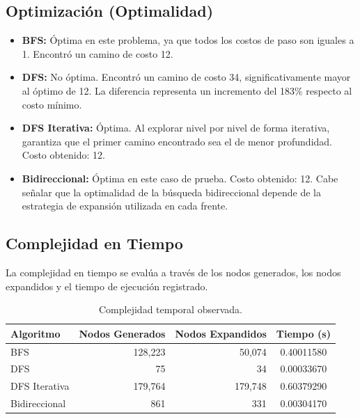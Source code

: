 \documentclass{article}
\begin{document}
\subsection{Optimización (Optimalidad)}

\begin{itemize}

    \item \textbf{BFS:} Óptima en este problema, ya que todos los
    costos de paso son iguales a 1. Encontró un camino de costo 12.

    \item \textbf{DFS:} No óptima. Encontró un camino de costo 34,
    significativamente mayor al óptimo de 12. La diferencia representa
    un incremento del 183\% respecto al costo mínimo.

    \item \textbf{DFS Iterativa:} Óptima. Al explorar nivel por nivel
    de forma iterativa, garantiza que el primer camino encontrado sea
    el de menor profundidad. Costo obtenido: 12.

    \item \textbf{Bidireccional:} Óptima en este caso de prueba.
    Costo obtenido: 12. Cabe señalar que la optimalidad de la búsqueda
    bidireccional depende de la estrategia de expansión utilizada en
    cada frente.

\end{itemize}

\subsection{Complejidad en Tiempo}

La complejidad en tiempo se evalúa a través de los nodos generados,
los nodos expandidos y el tiempo de ejecución registrado.

\begin{table}[H]
\centering

\begin{tabular}{|l|r|r|c|}
\hline

\textbf{Algoritmo} &
\textbf{Nodos Generados} &
\textbf{Nodos Expandidos} &
\textbf{Tiempo (s)}
\\ \hline

BFS &
128,223 &
50,074 &
0.40011580
\\ \hline

DFS &
75 &
34 &
0.00033670
\\ \hline

DFS Iterativa &
179,764 &
179,748 &
0.60379290
\\ \hline

Bidireccional &
861 &
331 &
0.00304170
\\ \hline

\end{tabular}

\caption{Complejidad temporal observada.}

\end{table}
\end{document}
